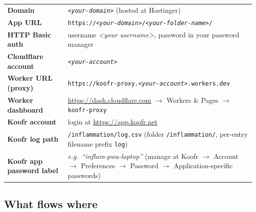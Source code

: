 \documentclass[11pt,a4paper]{article}
\begin{document}
\begin{center}
\renewcommand{\arraystretch}{1.35}
\begin{tabularx}{\linewidth}{lX}
\textbf{Domain} & \texttt{\textit{\color{red!70!black}<your-domain>}} (hosted at Hostinger) \\
\textbf{App URL} & \texttt{https://\textit{\color{red!70!black}<your-domain>}/\textit{\color{red!70!black}<your-folder-name>}/} \\
\textbf{HTTP Basic auth} & username \textit{\color{red!70!black}<your username>}, password in your password manager \\
\textbf{Cloudflare account} & \texttt{\textit{\color{red!70!black}<your-account>}} \\
\textbf{Worker URL (proxy)} & \texttt{https://koofr-proxy.\textit{\color{red!70!black}<your-account>}.workers.dev} \\
\textbf{Worker dashboard} & \url{https://dash.cloudflare.com} $\rightarrow$ Workers \& Pages $\rightarrow$ \texttt{koofr-proxy} \\
\textbf{Koofr account} & login at \url{https://app.koofr.net} \\
\textbf{Koofr log path} & \texttt{/inflammation/log.csv} (folder \texttt{/inflammation/}, per-entry filename prefix \texttt{log}) \\
\textbf{Koofr app password label} & \textit{\color{red!70!black}e.g.\ ``inflam-pwa-laptop''} (manage at Koofr $\rightarrow$ Account $\rightarrow$ Preferences $\rightarrow$ Password $\rightarrow$ Application-specific passwords) \\
\end{tabularx}
\end{center}

\subsection{What flows where}
\end{document}

